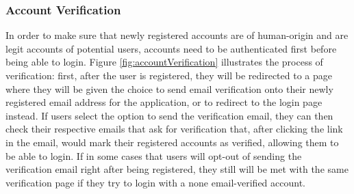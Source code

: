 \subsubsection{Account Verification}
In order to make sure that newly registered accounts are of human-origin and are legit accounts of potential users, accounts need to be authenticated first before being able to login. Figure \ref{fig:accountVerification}   illustrates the process of verification: first, after the user is registered, they will be redirected to a page where they will be given the choice to send email verification onto their newly registered email address for the application, or to redirect to the login page instead. If users select the option to send the verification email, they can then check their respective emails that ask for verification that, after clicking the link in the email, would mark their registered accounts as verified, allowing them to be able to login. If in some cases that users will opt-out of sending the verification email right after being registered, they still will be met with the same verification page if they try to login with a none email-verified account. 

